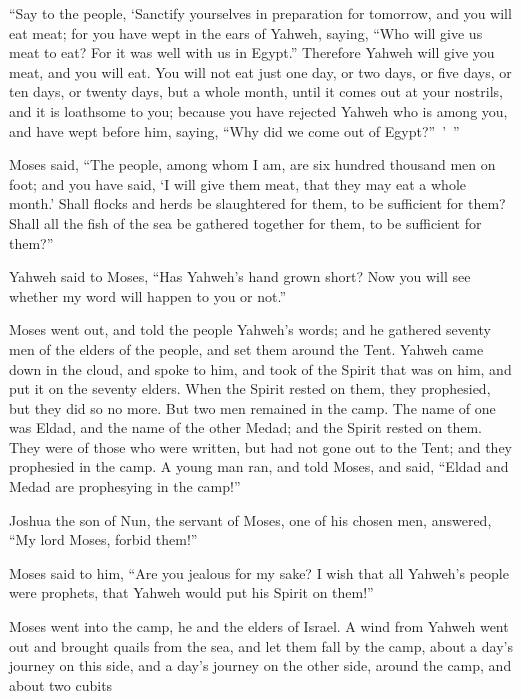 {\par }{\PP {}“Say to the people, ‘Sanctify yourselves in preparation for tomorrow, and you will eat meat; for you have wept in the ears of Yahweh, saying, “Who will give us meat to eat? For it was well with us in Egypt.” Therefore Yahweh will give you meat, and you will eat.
You will not eat just one day, or two days, or five days, or ten days, or twenty days,
but a whole month, until it comes out at your nostrils, and it is loathsome to you; because you have rejected Yahweh who is among you, and have wept before him, saying, “Why did we come out of Egypt?” ’ ”
\par }{\PP {}Moses said, “The people, among whom I am, are six hundred thousand men on foot; and you have said, ‘I will give them meat, that they may eat a whole month.’
Shall flocks and herds be slaughtered for them, to be sufficient for them? Shall all the fish of the sea be gathered together for them, to be sufficient for them?”
\par }{\PP {}Yahweh said to Moses, “Has Yahweh’s hand grown short? Now you will see whether my word will happen to you or not.”
\par }{\PP {}Moses went out, and told the people Yahweh’s words; and he gathered seventy men of the elders of the people, and set them around the Tent.
Yahweh came down in the cloud, and spoke to him, and took of the Spirit that was on him, and put it on the seventy elders. When the Spirit rested on them, they prophesied, but they did so no more.
But two men remained in the camp. The name of one was Eldad, and the name of the other Medad; and the Spirit rested on them. They were of those who were written, but had not gone out to the Tent; and they prophesied in the camp.
A young man ran, and told Moses, and said, “Eldad and Medad are prophesying in the camp!”
\par }{\PP {}Joshua the son of Nun, the servant of Moses, one of his chosen men, answered, “My lord Moses, forbid them!”
\par }{\PP {}Moses said to him, “Are you jealous for my sake? I wish that all Yahweh’s people were prophets, that Yahweh would put his Spirit on them!”
\par }{\PP {}Moses went into the camp, he and the elders of Israel.
A wind from Yahweh went out and brought quails from the sea, and let them fall by the camp, about a day’s journey on this side, and a day’s journey on the other side, around the camp, and about two cubits}
